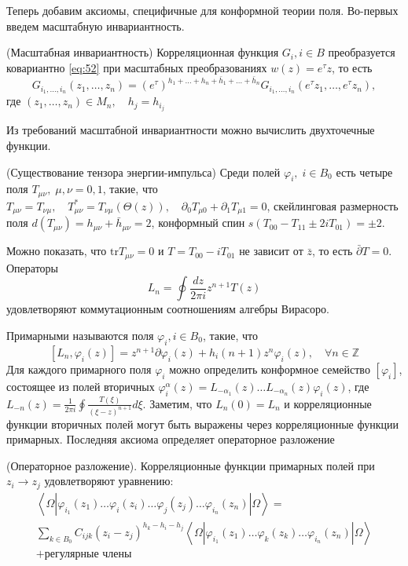 Теперь добавим аксиомы, специфичные для конформной теории поля. Во-первых введем масштабную инвариантность.
\begin{axiom}
  (Масштабная инвариантность)
  Корреляционная функция $G_{i}, i\in B$ преобразуется ковариантно \eqref{eq:52} при масштабных преобразованиях $w(z)=e^{\tau}z$, то есть
  \begin{equation}
    \label{eq:58}
    G_{i_{1},\dots,i_{n}}(z_{1},\dots,z_{n})=\left(e^{\tau}\right)^{h_{1}+\dots+h_{n}+\bar{h}_{1}+\dots+\bar{h}_{n}} G_{i_{1},\dots,i_{n}}(e^{\tau} z_{1},\dots,e^{\tau} z_{n}),
  \end{equation}
  где $(z_{1},\dots,z_{n})\in M_{n},\quad h_{j}=h_{i_{j}}$
\end{axiom}
Из требований масштабной инвариантности можно вычислить двухточечные функции. 
\begin{axiom}
  (Существование тензора энергии-импульса)
  Среди полей $\varphi_{i},\; i\in B_{0}$ есть четыре поля $T_{\mu\nu},\; \mu,\nu=0,1$, такие, что $T_{\mu\nu}=T_{\nu\mu},\quad T_{\mu\nu}^{*}=T_{\nu\mu}(\Theta(z)),\quad \partial_{0} T_{\mu 0}+\partial_{1}T_{\mu 1}=0$, скейлинговая размерность поля $d(T_{\mu\nu})=h_{\mu\nu}+\bar{h}_{\mu\nu}=2$, конформный спин $s(T_{00}-T_{11}\pm 2i T_{01})=\pm 2$. 
\end{axiom}
Можно показать, что $\mathrm{tr} T_{\mu\nu}=0$ и $T=T_{00}-i T_{01}$ не зависит от $\bar z$, то есть $\bar \partial T=0$. Операторы 
\begin{equation}
  \label{eq:59}
    L_{n}=\oint \frac{dz}{2\pi i} z^{n+1} T(z)
\end{equation}
удовлетворяют коммутационным соотношениям алгебры Вирасоро. 

Примарными называются поля $\varphi_{i}, i\in B_{0}$, такие, что
\begin{equation}
  \label{eq:60}
  [L_{n}, \varphi_{i}(z)]=z^{n+1}\partial \varphi_{i}(z)+h_{i}(n+1)z^{n}\varphi_{i}(z),\quad \forall n\in\mathbb{Z}
\end{equation}
Для каждого примарного поля $\varphi_{i}$ можно определить конформное семейство $[\varphi_{i}]$, состоящее из полей вторичных $\varphi_{i}^{\alpha}(z)=L_{-\alpha_{1}}(z)\dots L_{-\alpha_{n}}(z)\varphi_{i}(z)$, где $L_{-n}(z)=\frac{1}{2\pi i}\oint\frac{T(\xi)}{(\xi-z)^{n+1}} d\xi$. Заметим, что $L_{n}(0)=L_{n}$ и корреляционные функции вторичных полей могут быть выражены через корреляционные функции примарных. Последняя аксиома определяет операторное разложение
\begin{axiom}
(Операторное разложение).
Корреляционные функции примарных полей  при $z_{i}\to z_{j}$ удовлетворяют уравнению:
\begin{multline}
  \label{eq:61}
  \left<\Omega|\varphi_{i_{1}}(z_{1})\dots\varphi_{i}(z_{i})\dots \varphi_{j}(z_{j})\dots \varphi_{i_{n}}(z_{n})|\Omega\right>=\\
  \sum_{k\in B_{0}}C_{ijk} (z_{i}-z_{j})^{h_{k}-h_{i}-h_{j}} \left<\Omega|\varphi_{i_{1}}(z_{1})\dots\varphi_{k}(z_{k})\dots \varphi_{i_{n}}(z_{n})|\Omega\right>\\
  +\mbox{регулярные члены}
\end{multline}

\end{axiom}

